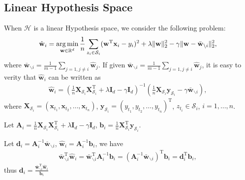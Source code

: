 \documentclass{article}
\newcommand{\argmin}{\operatornamewithlimits{arg\,min}}
\begin{document}
\subsection{Linear Hypothesis Space}
When $\mathcal{H}$ is a linear Hypothesis space,
we consider the following problem:
\begin{align*}
  \hat{\mathbf w}_i=\argmin_{\mathbf w\in\mathbb{R}^d}
  \frac{1}{n}\sum_{z_i\in\mathcal{S}_i}(\mathbf w^\mathrm{T}\mathbf x_i-y_i)^2+\lambda \|\mathbf w\|_2^2-\gamma \|\mathbf w-\bar{\mathbf w}_{\backslash i}\|_2^2,
\end{align*}
where $\bar{\mathbf w}_{\backslash i}=\frac{1}{m-1}\sum_{j=1,j\not =i}\hat{\mathbf w}_j$.
If given $\bar{\mathbf w}_{\backslash i}=\frac{1}{m-1}\sum_{j=1,j\not =i}\hat{\mathbf w}_j$,
it is easy to verity that $\hat{\mathbf w}_i$ can be written as
\begin{align*}
  \hat{\mathbf w}_i=\left(\frac{1}{n}\mathbf X_{\mathcal{S}_i}\mathbf X_{\mathcal{S}_i}^\mathrm{T}+\lambda \mathbf I_d-\gamma \mathbf I_d\right)^{-1}
  \left(\frac{1}{n}\mathbf X_{\mathcal{S}_i}\mathbf y_{\mathcal{S}_i}-\gamma \bar{\mathbf w}_{\backslash i}\right),
\end{align*}
where $\mathbf X_{\mathcal{S}_i}=(\mathbf x_{t_1},\mathbf x_{t_2},\ldots, \mathbf x_{t_n})$,
$\mathbf y_{\mathcal{S}_i}=(y_{t_1},y_{t_2},\ldots,y_{t_n})^\mathrm{T}$, $z_{t_i}\in \mathcal{S}_i$, $i=1,\ldots, n$.


Let $\mathbf A_i=\frac{1}{n}\mathbf X_{\mathcal{S}_i}\mathbf X_{\mathcal{S}_i}^\mathrm{T}+\lambda \mathbf I_d-\gamma \mathbf I_d$,
$\mathbf b_i=\frac{1}{n}\mathbf X_{\mathcal{S}_i}^\mathrm{T}\mathbf y_{\mathcal{S}_i}$.

Let $\mathbf d_i=\mathbf A_i^{-1}\bar{\mathbf w}_{\backslash i}$,
  $\hat{\mathbf w}_i=\mathbf A_i^{-1} \mathbf b_i$,
  we have
  \begin{align*}
    \bar{\mathbf w}_{\backslash i}^\mathrm{T}\hat{\mathbf w}_i=\bar{\mathbf w}_{\backslash i}^\mathrm{T}\mathbf A_i^{-1} \mathbf b_i
    =\left(\mathbf A_i^{-1}\bar{\mathbf w}_{\backslash i}\right)^\mathrm{T}\mathbf b_i=\mathbf d_i^\mathrm{T}\mathbf b_i,
  \end{align*}
  thus $\mathbf d_i=\frac{\bar{\mathbf w}_{\backslash i}^\mathrm{T}\hat{\mathbf w}_i}{\mathbf b_i}$
\end{document}
